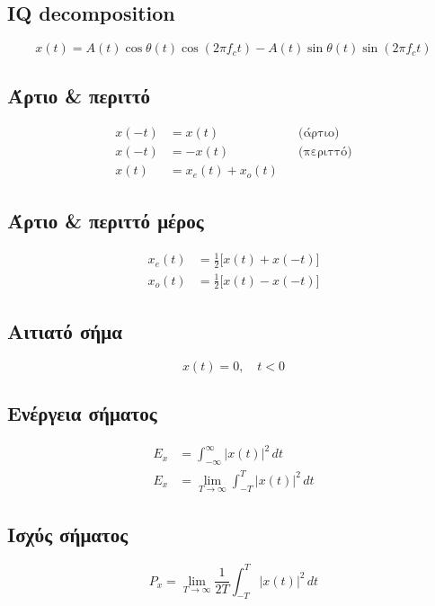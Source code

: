 \documentclass[11pt,a4paper]{article}
\begin{document}
\subsection{IQ decomposition}
\begin{equation}
x(t) = A(t)\cos\theta(t)\cos(2\pi f_c t) - A(t)\sin\theta(t)\sin(2\pi f_c t)
\end{equation}

\subsection{Άρτιο \& περιττό}
\begin{align}
x(-t) &= x(t) && \text{(άρτιο)} \\
x(-t) &= -x(t) && \text{(περιττό)} \\
x(t) &= x_e(t) + x_o(t)
\end{align}

\subsection{Άρτιο \& περιττό μέρος}
\begin{align}
x_e(t) &= \frac{1}{2}\bigl[x(t) + x(-t)\bigr] \\
x_o(t) &= \frac{1}{2}\bigl[x(t) - x(-t)\bigr]
\end{align}

\subsection{Αιτιατό σήμα}
\begin{equation}
x(t) = 0, \quad t < 0
\end{equation}

\subsection{Ενέργεια σήματος}
\begin{align}
E_x &= \int_{-\infty}^{\infty} |x(t)|^2\,dt \\
E_x &= \lim_{T\to\infty} \int_{-T}^{T} |x(t)|^2\,dt
\end{align}

\subsection{Ισχύς σήματος}
\begin{equation}
P_x = \lim_{T\to\infty} \frac{1}{2T} \int_{-T}^{T} |x(t)|^2\,dt
\end{equation}
\end{document}

